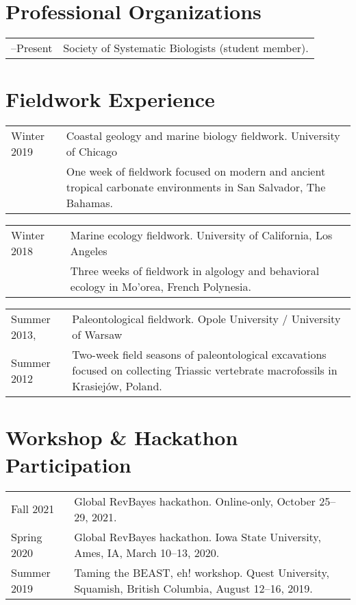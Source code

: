 \documentclass[10pt]{article}
\begin{document}
\section*{Professional Organizations}

\begin{tabularx}{\textwidth}{>{\raggedleft\arraybackslash}p{2.2cm} X}
2017--Present & Society of Systematic Biologists (student member).
\end{tabularx}

\section*{Fieldwork Experience}

\begin{tabularx}{\textwidth}{>{\raggedleft\arraybackslash}p{2.2cm} X}
Winter 2019 & Coastal geology and marine biology fieldwork. University of Chicago \\
& One week of fieldwork focused on modern and ancient tropical carbonate environments in San Salvador, The Bahamas.
\end{tabularx}
\begin{tabularx}{\textwidth}{>{\raggedleft\arraybackslash}p{2.2cm} X}
Winter 2018 & Marine ecology fieldwork. University of California, Los Angeles \\
& Three weeks of fieldwork in algology and behavioral ecology in Mo'orea, French Polynesia.
\end{tabularx}
\begin{tabularx}{\textwidth}{>{\raggedleft\arraybackslash}p{2.2cm} X}
Summer 2013, & Paleontological fieldwork. Opole University / University of Warsaw \\
Summer 2012 & Two-week field seasons of paleontological excavations focused on collecting Triassic vertebrate macrofossils in Krasiej\'{o}w, Poland.
\end{tabularx}

\section*{Workshop \& Hackathon Participation}

\begin{tabularx}{\textwidth}{>{\raggedleft\arraybackslash}p{2.2cm} X}
Fall 2021 & Global \textsf{RevBayes} hackathon. Online-only, October 25--29, 2021. \\[0.1cm]
Spring 2020 & Global \textsf{RevBayes} hackathon. Iowa State University, Ames, IA, March 10--13, 2020. \\[0.1cm]
Summer 2019 & Taming the BEAST, eh! workshop. Quest University, Squamish, British Columbia, August 12--16, 2019.
\end{tabularx}
\end{document}
